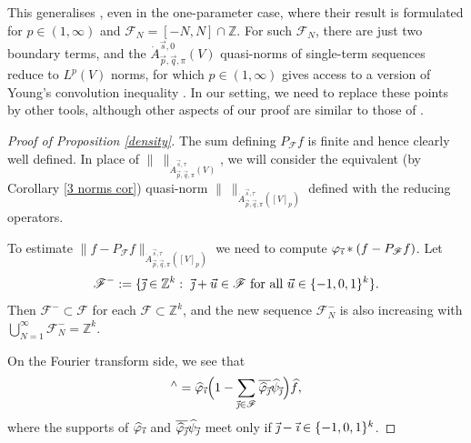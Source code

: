 \documentclass[11pt, reqno]{amsart}
\theoremstyle{definition}
\theoremstyle{remark}
\numberwithin{equation}{section}
\newcommand{\Fs}{\mathscr F}
\newcommand{\Z}{\mathbb Z}
\newcommand{\vi}{\vec{\textit{\i}}}
\newcommand{\vj}{\vec{\textit{\j}}}
\newcommand{\vp}{\vec p}
\newcommand{\vq}{\vec q}
\newcommand{\vs}{\vec s}
\newcommand{\vu}{\vec u}
\newcommand{\Atau}{\dot A^{\vs,\tau}_{\vp,\vq,\pi}}
\newcommand{\Norm}[2]{\|#1\|_{#2}}
\begin{document}
This generalises \cite[Lemma 4.5]{FR21}, even in the one-parameter case, where their result is formulated for $p\in(1,\infty)$ and $\Fs_N=[-N,N]\cap\Z$. For such $\Fs_N$, there are just two boundary terms, and the $\dot A_{\vec p,\vec q,\pi}^{\vec s,0}(V)$ quasi-norms of single-term sequences reduce to $L^p(V)$ norms, for which $p\in(1,\infty)$ gives access to a version of Young's convolution inequality \cite[Lemma 4.4]{FR21}.
In our setting, we need to replace these points by other tools, although other aspects of our proof are similar to those of \cite[Lemma 4.5]{FR21}.

\begin{proof}[Proof of Proposition \ref{density}]
The sum defining $P_{\Fs} f$ is finite and hence clearly well defined. In place of $\Norm{\ }{\Atau(V)}$, we will consider the equivalent (by Corollary \ref{3 norms cor}) quasi-norm $\Norm{\ }{\Atau([V]_p)}$ defined with the reducing operators.

To estimate $\Norm{f-P_{\Fs} f}{\Atau([V]_p)}$ we need to compute $\varphi_{\vi}*(f-P_{\Fs} f)$. Let
\begin{equation*}
\Fs^- :=\{\vj\in\Z^k:\
\vj+\vu\in\Fs\text{ for all }\vu\in\{-1,0,1\}^k\}.
\end{equation*}
Then $\Fs^-\subset\Fs$ for each $\Fs\subset\Z^k$, and the new sequence $\Fs_N^-$ is also increasing with $\bigcup_{N=1}^\infty\Fs_N^-=\Z^k$.

On the Fourier transform side, we see that
\begin{equation*}
[\varphi_{\vi}*(f-P_{\Fs} f)]^{\wedge}
=\widehat{\varphi}_{\vi} \Big( 1-\sum_{\vj\in\Fs}
\overline{\widehat{\varphi}_{\vj}}\widehat{\psi}_{\vj} \Big)\widehat{f},
\end{equation*}
where the supports of $\widehat{\varphi}_{\vi}$ and $\overline{\widehat{\varphi}_{\vj}}\widehat{\psi}_{\vj}$ meet only if $\vj-\vi\in\{-1,0,1\}^k$.


\end{proof}
\end{document}
